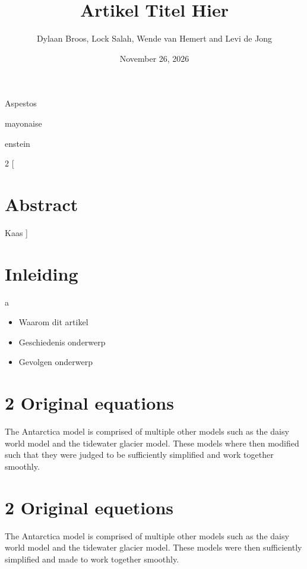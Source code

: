 \documentclass[
]{article}
\author{Dylaan Broos, Lock Salah, Wende van Hemert and Levi de Jong} %
\date{November 26, 2026} %
\title{Artikel Titel Hier} %
\begin{document}

\begin{titlepage}
\maketitle  %
\begin{center} 
Aspestos\par
mayonaise\par
enstein
\end{center}
\end{titlepage}

\maketitle
\begin{multicols}{2}
[
\section{Abstract}
Kaas
]
\section{Inleiding}

a

\begin{itemize} %
\item
  Waarom dit artikel
\item
  Geschiedenis onderwerp
\item
  Gevolgen onderwerp
\end{itemize} %

\section{2 Original equations} %
The Antarctica model is comprised of multiple other models such as the daisy world model and the tidewater glacier model. These models where then modified such that they were judged to be sufficiently simplified and work together smoothly.

\section{2 Original equetions} %
The Antarctica model is comprised of multiple other models such as the daisy world model and the tidewater glacier model. These models were then sufficiently simplified and made to work together smoothly.


\end{multicols}
\end{document}
